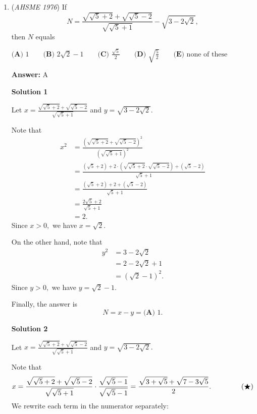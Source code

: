 \begin{enumerate}
 


	\item (\textit{AHSME 1976}) If 
 \[N=\frac{\sqrt{\sqrt{5}+2}+\sqrt{\sqrt{5}-2}}{\sqrt{\sqrt{5}+1}}-\sqrt{3-2\sqrt{2}},\] then $N$ equals


 $\textbf{(A) }1\qquad \textbf{(B) }2\sqrt{2}-1\qquad \textbf{(C) }\frac{\sqrt{5}}{2}\qquad \textbf{(D) }\sqrt{\frac{5}{2}}\qquad \textbf{(E) }\text{none of these}$

 \textbf{Answer: }A



\textbf{Solution 1}

Let $x=\frac{\sqrt{\sqrt{5}+2}+\sqrt{\sqrt{5}-2}}{\sqrt{\sqrt{5}+1}}$ and $y=\sqrt{3-2\sqrt{2}}.$

 Note that
 \begin{align*} x^2&=\frac{\left(\sqrt{\sqrt{5}+2}+\sqrt{\sqrt{5}-2}\right)^2}{\left(\sqrt{\sqrt{5}+1}\right)^2} \\ &=\frac{\left(\sqrt{5}+2\right)+2\cdot\left(\sqrt{\sqrt{5}+2}\cdot\sqrt{\sqrt{5}-2}\right)+\left(\sqrt{5}-2\right)}{\sqrt{5}+1} \\ &=\frac{\left(\sqrt{5}+2\right)+2+\left(\sqrt{5}-2\right)}{\sqrt{5}+1} \\ &=\frac{2\sqrt{5}+2}{\sqrt{5}+1} \\ &=2. \end{align*}
Since $x>0,$ we have $x=\sqrt{2}.$

 On the other hand, note that
 \begin{align*} y^2&=3-2\sqrt{2} \\ &=2-2\sqrt{2}+1 \\ &=\left(\sqrt{2}-1\right)^2. \end{align*}
Since $y>0,$ we have $y=\sqrt{2}-1.$

 Finally, the answer is 
 \[N=x-y=\boxed{\textbf{(A) }1}.\]




\textbf{Solution 2}

Let $x=\frac{\sqrt{\sqrt{5}+2}+\sqrt{\sqrt{5}-2}}{\sqrt{\sqrt{5}+1}}$ and $y=\sqrt{3-2\sqrt{2}}.$

 Note that
 \[x=\frac{\sqrt{\sqrt{5}+2}+\sqrt{\sqrt{5}-2}}{\sqrt{\sqrt{5}+1}}\cdot\frac{\sqrt{\sqrt{5}-1}}{\sqrt{\sqrt{5}-1}}=\frac{\sqrt{3+\sqrt{5}}+\sqrt{7-3\sqrt{5}}}{2}. \hspace{15mm} (\bigstar)\]We rewrite each term in the numerator separately:


\end{enumerate}
